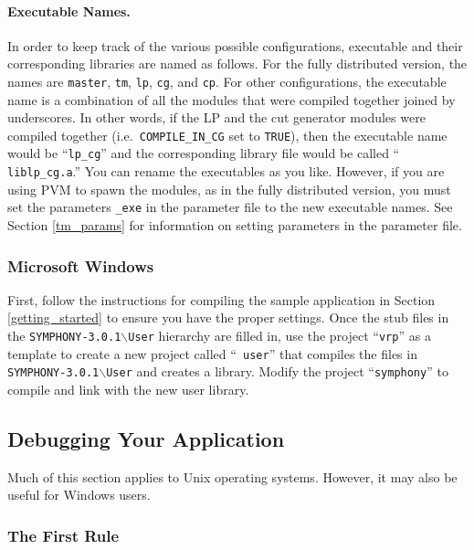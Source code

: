 \paragraph{Executable Names.}
\label{exe_names}
In order to keep track of the various possible configurations,
executable and their corresponding libraries are named as follows. For
the fully distributed version, the names are {\tt master}, {\tt tm},
{\tt lp}, {\tt cg}, and {\tt cp}. For other configurations, the
executable name is a combination of all the modules that were compiled
together joined by underscores. In other words, if the LP and the cut
generator modules were compiled together (i.e.~{\tt COMPILE\_IN\_CG}
set to {\tt TRUE}), then the executable name would be ``{\tt lp\_cg}''
and the corresponding library file would be called ``{\tt
liblp\_cg.a}.'' You can rename the executables as you like. However, if
you are using PVM to spawn the modules, as in the fully distributed
version, you must set the parameters {\tt *\_exe} in the parameter
file to the new executable names. See Section \ref{tm_params} for
information on setting parameters in the parameter file.

\subsubsection{Microsoft Windows}

First, follow the instructions for compiling the sample application in Section
\ref{getting_started} to ensure you have the proper settings. Once the stub 
files in the {\tt SYMPHONY-3.0.1$\backslash$User} hierarchy are filled in, use
the project ``{\tt vrp}'' as a template to create a new project called ``{\tt
user}'' that compiles the files in {\tt SYMPHONY-3.0.1$\backslash$User} and
creates a library. Modify the project ``{\tt symphony}'' to compile and link
with the new user library.

\subsection{Debugging Your Application}

Much of this section applies to Unix operating systems. However, it may
also be useful for Windows users.

\subsubsection{The First Rule}

